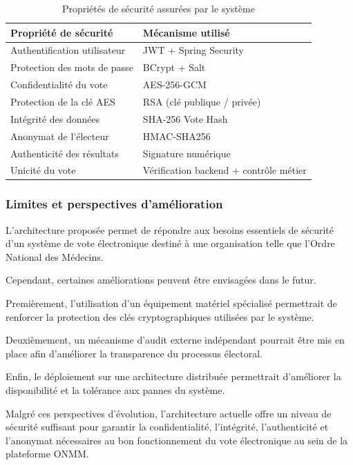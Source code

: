 ﻿\documentclass[12pt,a4paper]{report}
\begin{document}
\begin{table}[H]
\centering
\begin{tabular}{|p{7cm}|p{6cm}|}
\hline
\textbf{Propriété de sécurité} & \textbf{Mécanisme utilisé} \\
\hline
Authentification utilisateur & JWT + Spring Security \\
\hline
Protection des mots de passe & BCrypt + Salt \\
\hline
Confidentialité du vote & AES-256-GCM \\
\hline
Protection de la clé AES & RSA (clé publique / privée) \\
\hline
Intégrité des données & SHA-256 Vote Hash \\
\hline
Anonymat de l’électeur & HMAC-SHA256 \\
\hline
Authenticité des résultats & Signature numérique \\
\hline
Unicité du vote & Vérification backend + contrôle métier \\
\hline
\end{tabular}
\caption{Propriétés de sécurité assurées par le système}
\end{table}

\subsubsection{Limites et perspectives d’amélioration}

L’architecture proposée permet de répondre aux besoins essentiels de sécurité
d’un système de vote électronique destiné à une organisation telle que l’Ordre
National des Médecins.

Cependant, certaines améliorations peuvent être envisagées dans le futur.

Premièrement, l’utilisation d’un équipement matériel spécialisé permettrait de
renforcer la protection des clés cryptographiques utilisées par le système.

Deuxièmement, un mécanisme d’audit externe indépendant pourrait être mis en
place afin d’améliorer la transparence du processus électoral.

Enfin, le déploiement sur une architecture distribuée permettrait d’améliorer
la disponibilité et la tolérance aux pannes du système.

Malgré ces perspectives d’évolution, l’architecture actuelle offre un niveau de
sécurité suffisant pour garantir la confidentialité, l’intégrité,
l’authenticité et l’anonymat nécessaires au bon fonctionnement du vote
électronique au sein de la plateforme ONMM.
\end{document}
